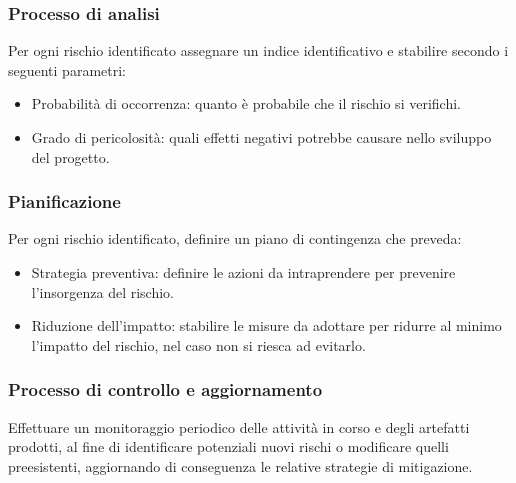 \documentclass{article}
\begin{document}
\subsubsection{Processo di analisi}
Per ogni rischio identificato assegnare un indice identificativo e stabilire secondo i seguenti parametri:
\begin{itemize}
    \item Probabilità di occorrenza: quanto è probabile che il rischio si verifichi.
    \item Grado di pericolosità: quali effetti negativi potrebbe causare nello sviluppo del progetto.
\end{itemize}

\subsubsection{Pianificazione}
Per ogni rischio identificato, definire un piano di contingenza che preveda:
\begin{itemize}
    \item Strategia preventiva: definire le azioni da intraprendere per prevenire l’insorgenza del rischio.
    \item Riduzione dell'impatto: stabilire le misure da adottare per ridurre al minimo l'impatto del rischio, nel caso non si riesca ad evitarlo.
\end{itemize}

\subsubsection{Processo di controllo e aggiornamento}
Effettuare un monitoraggio periodico delle attività in corso e degli artefatti prodotti, al fine di identificare potenziali nuovi rischi o modificare quelli preesistenti, aggiornando di conseguenza le relative strategie di mitigazione.

\end{document}
